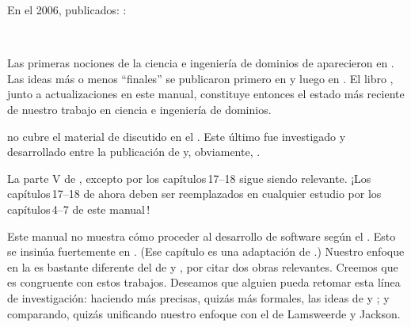 
\begynd
\pind En el 2006,  publicados: \cite{TheSEBook1,TheSEBook2,TheSEBook3}:
\afslut

\begin{center}
\ \
\ \
\end{center}

\label{Domain Engineering 2016 2022}
\begynd
\pind Las primeras nociones de la ciencia e ingeniería de dominios de
      \cite{BjornerMonograph2020} aparecieron en \cite[2010]{Kiev:2010ptI,Kiev:2010ptII}.
\pind Las ideas más o menos ``finales'' se publicaron primero en \cite[2017]{BjornerFAoC2015MDAAD} y 
      luego en \cite[marzo de 2019]{BjornerTOSEM2018}.
\pind El libro \cite{BjornerMonograph2020}, junto a actualizaciones en este
      manual, constituye entonces el estado más reciente de nuestro trabajo en ciencia
      e ingeniería de dominios.

\pind \cite[Ingeniería de Software, III, parte V]{TheSEBook3} no
      cubre el material de  discutido en el
      \cite[capítulo 8: Facetas del Dominio]{BjornerMonograph2020}.
\begynd
\pind Este último fue investigado \cite{dines:facs:2008} y desarrollado entre la publicación
      de \cite{TheSEBook3} y, obviamente, \cite{BjornerMonograph2020}.
\afslut
\afslut

\begynd
\pind La parte V de \cite{TheSEBook3}, excepto por los capítulos\,17--18 sigue siendo
      relevante.
\pind ¡Los capítulos\,17--18 de \cite{TheSEBook3} ahora deben ser reemplazados en
      cualquier estudio por los capítulos\,4--7 de \cite{BjornerMonograph2020} 
      este manual\,!
\afslut


\begynd
\pind Este manual no muestra cómo proceder al desarrollo de software según el .
\begynd
\pind Esto se insinúa fuertemente en \cite[Capítulo 9]{BjornerMonograph2020}.
\pind (Ese capítulo es una adaptación de \cite[mayo de 2008]{dines:ugo65:2008}.)
\pind Nuestro enfoque en la \sfsl{ingeniería de requisitos} es bastante
      diferente del de \cite[A. van Laamswerde]{Lamsweerde} y
      \cite[M.\ A.\ Jackson]{Jackson2010Facs}, por citar dos obras
      relevantes.
\pind Creemos  que es congruente con estos trabajos.
\pind Deseamos \ysfchg{firmemente} que alguien pueda retomar esta línea de investigación:
\begynd
\pind haciendo más precisas, quizás más formales, las ideas de
       y ;
\pind y comparando, quizás unificando nuestro enfoque con el de
      Lamsweerde y Jackson.
\afslut
\afslut
\afslut
{}

